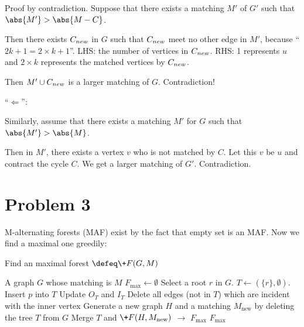 \documentclass{article}
\begin{document}
\vspace{0.5em}
Proof by contradiction.
Suppose that there exists a matching $M'$ of $G'$ such that $\abs{M'}>\abs{M-C}$.

Then there exists $C_{\-{new}}$ in $G$ such that $C_{\-{new}}$ meet no other edge in $M'$, because ``$2k+1=2\times k +1$''. LHS: the number of vertices in $C_{\-{new}}$. RHS: 1 represents $u$ and $2\times k$ represents the matched vertices by $C_{\-{new}}$.

Then $M'\cup C_{\-{new}}$ is a larger matching of $G$. Contradiction!

\vspace{1em}
``$\Longleftarrow$'':

\vspace{0.5em}
Similarly, assume that there exists a matching $M'$ for $G$ such that $\abs{M'}>\abs{M}$.

Then in $M'$, there exists a vertex $v$ who is not matched by $C$. Let this $v$ be $u$ and contract the cycle $C$.
We get a larger matching of $G'$. Contradiction.

\section*{Problem 3}
M-alternating forests (MAF) exist by the fact that empty set is an MAF.
Now we find a maximal one greedily:
\begin{algorithm}[htbp]
	\caption{Find an maximal forest $\defeq\+F(G,M)$}
	\label{maf}
	\begin{algorithmic}[1]
		\renewcommand{\algorithmicrequire}{\textbf{Input:}}
		\renewcommand{\algorithmicensure}{\textbf{Output:}}
		\renewcommand{\algorithmiccomment}[1]{\hfill\textit{\textcolor{blue}{\##1}}}
		\REQUIRE A graph $G$ whose matching is $M$
		\STATE $F_{\max}\gets \emptyset$
		\STATE Select a root $r$ in $G$. $T\gets (\{r\},\emptyset)$.
		\STATE Insert $p$ into $T$
		\STATE Update $O_T$ and $I_T$
		\STATE Delete all edges (not in $T$) which are incident with the inner vertex
		\ENDWHILE
		\STATE Generate a new graph $H$ and a matching $M_{\mathrm{new}}$ by deleting the tree $T$ from $G$
		\STATE Merge $T$ and $\+F(H,M_{\mathrm{new}})$ $\longrightarrow$ $F_{\max}$
		\RETURN $F_{\max}$
	\end{algorithmic} 
\end{algorithm}
\end{document}
